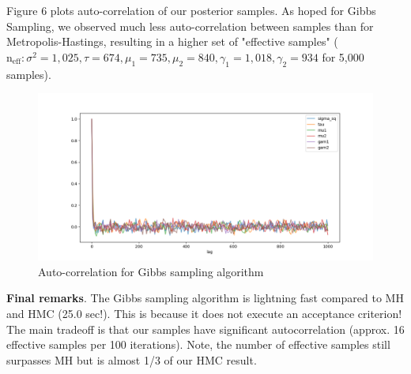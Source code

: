 \documentclass[12pt,letterpaper,twoside]{article}
\begin{document}
Figure 6 plots auto-correlation of our posterior samples. As hoped
for Gibbs Sampling, we observed much less auto-correlation between 
samples than for Metropolis-Hastings, resulting in a higher 
set of "effective samples" ($\text{n}_{\text{eff}}: \sigma^2=1,025, \tau=674, \mu_1=735, \mu_2=840, \gamma_1=1,018, \gamma_2=934$ 
for 5,000 samples).
\begin{figure}[H]
    \centering
    \includegraphics[scale=0.6]{gibbs_autocorr_plot.png}
    \vspace*{-10mm}
    \caption{Auto-correlation for Gibbs sampling algorithm}
\end{figure}

\textbf{Final remarks}. The Gibbs sampling algorithm is lightning 
fast compared to MH and HMC (25.0 sec!). This is because it does 
not execute an acceptance criterion! The main tradeoff is that our 
samples have significant autocorrelation (approx. 16 effective 
samples per 100 iterations). Note, the number of effective samples 
still surpasses MH but is almost 1/3 of our HMC result.



\end{document}
